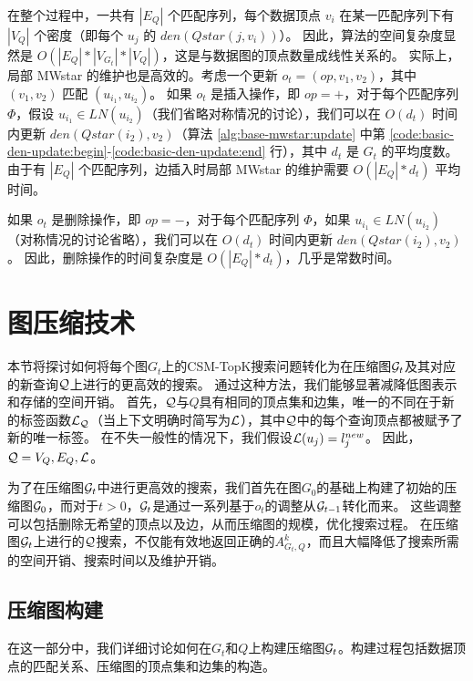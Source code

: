 在整个过程中，一共有 $|E_Q|$ 个匹配序列，每个数据顶点 $v_i$ 在某一匹配序列下有 $|V_Q|$ 个密度（即每个 $u_j$ 的 $den(Qstar(j, v_i))$）。
因此，算法的空间复杂度显然是 $O(|E_Q|*|V_{G_t}|*|V_Q|)$，这是与数据图的顶点数量成线性关系的。
实际上，局部 MWstar 的维护也是高效的。考虑一个更新 $o_t = (op, v_1, v_2)$，其中 $(v_1, v_2)$ 匹配 $(u_{i_1}, u_{i_2})$。
如果 $o_t$ 是插入操作，即 $op = +$，对于每个匹配序列 $\Phi$，假设 $u_{i_1} \in LN(u_{i_2})$（我们省略对称情况的讨论），我们可以在 $O(d_t)$ 时间内更新 $den(Qstar(i_2), v_2)$（算法 \ref{alg:base-mwstar:update} 中第 \ref{code:basic-den-update:begin}-\ref{code:basic-den-update:end} 行），其中 $d_t$ 是 $G_t$ 的平均度数。
由于有 $|E_Q|$ 个匹配序列，边插入时局部 MWstar 的维护需要 $O(|E_Q| * d_t)$ 平均时间。

如果 $o_t$ 是删除操作，即 $op = -$，对于每个匹配序列 $\Phi$，如果 $u_{i_1} \in LN(u_{i_2})$（对称情况的讨论省略），我们可以在 $O(d_t)$ 时间内更新 $den(Qstar(i_2), v_2)$。
因此，删除操作的时间复杂度是 $O(|E_Q| * d_t)$，几乎是常数时间。

\section{图压缩技术}
\label{mwstar:compact-graph}

本节将探讨如何将每个图$G_t$上的CSM-TopK搜索问题转化为在压缩图$\mathcal{G}_t$及其对应的新查询$\mathcal{Q}$上进行的更高效的搜索。
通过这种方法，我们能够显著减降低图表示和存储的空间开销。
首先，$\mathcal{Q}$与$Q$具有相同的顶点集和边集，唯一的不同在于新的标签函数$\mathcal{L}_{\mathcal{Q}}$（当上下文明确时简写为$\mathcal{L}$），其中$\mathcal{Q}$中的每个查询顶点都被赋予了新的唯一标签。
在不失一般性的情况下，我们假设$\mathcal{L}(u_j) = l_j^{new}$。
因此，$\mathcal{Q} = {V_Q, E_Q, \mathcal{L}}$。



为了在压缩图$\mathcal{G}_t$中进行更高效的搜索，我们首先在图$G_0$的基础上构建了初始的压缩图$\mathcal{G}_0$，而对于$t>0$，$\mathcal{G}_t$是通过一系列基于$o_t$的调整从$\mathcal{G}_{t-1}$转化而来。
这些调整可以包括删除无希望的顶点以及边，从而压缩图的规模，优化搜索过程。
在压缩图$\mathcal{G}_t$上进行的$\mathcal{Q}$搜索，不仅能有效地返回正确的$A_{G_t, Q}^k$，而且大幅降低了搜索所需的空间开销、搜索时间以及维护开销。

\subsection{压缩图构建}
\label{s-sec:compact-graph-construction}

在这一部分中，我们详细讨论如何在$G_t$和$Q$上构建压缩图$\mathcal{G}_t$。构建过程包括数据顶点的匹配关系、压缩图的顶点集和边集的构造。

